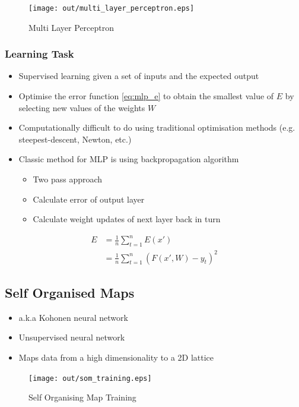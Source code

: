 \documentclass[a4paper]{article}
\begin{document}
\begin{figure}[h!]
  \centering
  \texttt{[image: out/multi\_layer\_perceptron.eps]}
  \caption{Multi Layer Perceptron}
  \label{fig:multi_layer_perceptron}
\end{figure}
\FloatBarrier

\subsubsection{Learning Task}

\begin{itemize}
  \item Supervised learning given a set of inputs and the expected output
  \item Optimise the error function \ref{eq:mlp_e} to obtain the smallest value
        of $E$ by selecting new values of the weights $W$
  \item Computationally difficult to do using traditional optimisation methods
        (e.g. steepest-descent, Newton, etc.)
  \item Classic method for MLP is using backpropagation algorithm
    \begin{itemize}
      \item Two pass approach
      \item Calculate error of output layer
      \item Calculate weight updates of next layer back in turn
    \end{itemize}
\end{itemize}

\begin{align}
  E &= \frac{1}{n} \sum^{n}_{t=1} E(x')                   \\
    &= \frac{1}{n} \sum^{n}_{t=1} (F(x', W) - y_{t})^{2}
  \label{eq:mlp_e}
\end{align}

\subsection{Self Organised Maps}

\begin{itemize}
  \item a.k.a Kohonen neural network
  \item Unsupervised neural network
  \item Maps data from a high dimensionality to a 2D lattice
\end{itemize}

\begin{figure}[h!]
  \centering
  \texttt{[image: out/som\_training.eps]}
  \caption{Self Organising Map Training}
  \label{fig:som_training}
\end{figure}
\FloatBarrier
\end{document}
